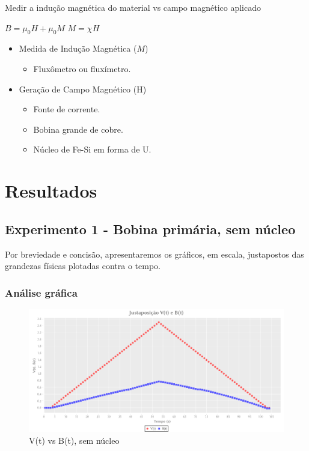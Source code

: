 \documentclass[11pt]{article}
\date{\today}
\title{}
\begin{document}
\tableofcontents

Medir a indução magnética do material vs campo magnético aplicado

\(B = \mu_{0} H + \mu_{0} M\) 
\(M = \chi H\)

\begin{itemize}
\item Medida de Indução Magnética (\(M\))
\begin{itemize}
\item Fluxômetro ou fluxímetro.
\end{itemize}

\item Geração de Campo Magnético (H)
\begin{itemize}
\item Fonte de corrente.
\item Bobina grande de cobre.
\item Núcleo de Fe-Si em forma de U.
\end{itemize}
\end{itemize}


\section{Resultados}
\label{sec:org44cb2ec}
\subsection{Experimento 1  - Bobina primária, sem núcleo}
\label{sec:org4ef7571}
Por breviedade e concisão, apresentaremos os gráficos, em escala, justapostos das grandezas físicas plotadas contra o tempo.


\subsubsection{Análise gráfica}
\label{sec:orgd406928}

{\begin{figure}[htbp]

\includegraphics[width=.9\linewidth]{img-plots/V-B-justaposicao-sem-nucleo.png}
\caption{V(t) vs B(t), sem núcleo}
\end{figure}}
\end{document}
